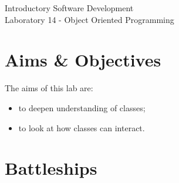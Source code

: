 \documentclass[12pt,oneside]{cttutorial}
\begin{document}
\tutorialextra{}


 

\newcommand{\xkcd}[2]{
	\begin{center}
	\texttt{[image: ../../Figures/png/\#1]}
	\newline
	\url{http://xkcd.com/#2}
	\end{center}
	\bigskip
}

\newcommand{\alert}[1]
{\marginpar
  {\makebox[0 pt][l]
    {\texttt{[image: ../../Figures/png/warning.png]}
  }
  \parbox{2 cm}{{\sffamily \bfseries \tiny #1}}}}


\renewcommand{\baselinestretch}{1.5}
\textwidth=15cm

\newcommand{\I}{j}

\begin{center}
\begin{bfseries}
Introductory Software Development\\Laboratory 14 - Object Oriented Programming
\end{bfseries}
\end{center}

\section{Aims \& Objectives}

The aims of this lab are:

\begin{itemize}
\item to deepen understanding of classes;
\item to look at how classes can interact.
\end{itemize}

\section{Battleships}
\end{document}

